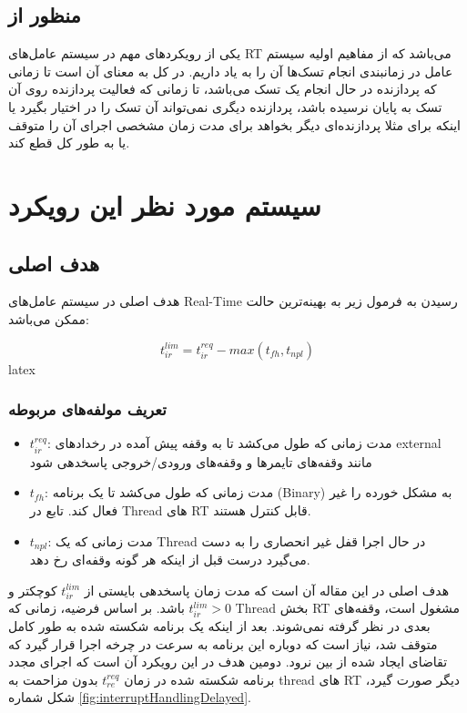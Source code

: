 \documentclass[10pt, a4paper]{article}
\begin{document}
\subsection{منظور از }

یکی از رویکرد‌های مهم در سیستم عامل‌های RT می‌باشد که از مفاهیم اولیه سیستم عامل
در زمانبندی انجام تسک‌ها آن را به یاد داریم. در کل به معنای آن است تا زمانی که
پردازنده در حال انجام یک تسک می‌باشد، تا زمانی که فعالیت پردازنده روی آن تسک به
پایان نرسیده باشد، پردازنده دیگری نمی‌تواند آن تسک را در اختیار بگیرد یا اینکه
برای مثلا پردازنده‌ای دیگر بخواهد برای مدت زمان مشخصی اجرای آن را متوقف یا به
طور کل قطع کند.

\section{سیستم مورد نظر این رویکرد}

\subsection{هدف اصلی}

هدف اصلی در سیستم عامل‌های Real-Time رسیدن به فرمول زیر به بهینه‌ترین حالت ممکن می‌باشد:

\begin{equation}
    t^{lim}_{ir} = t^{req}_{ir} - max(t_{fh}, t_{npl})
\end{equation}latex

\subsubsection{تعریف مولفه‌های مربوطه}

\begin{itemize}
    \item $t^{req}_{ir}$: مدت زمانی که طول می‌کشد تا به وقفه پیش آمده در
    رخداد‌های external مانند وقفه‌های تایمرها و وقفه‌های ورودی/خروجی پاسخدهی شود
    \item $t_{fh}$: مدت زمانی که طول می‌کشد تا  یک برنامه
    (Binary) به مشکل خورده را غیر فعال کند. تابع  در Thread
    های RT قابل کنترل هستند.
    \item $t_{npl}$: مدت زمانی که یک Thread در حال اجرا قفل غیر انحصاری را به
    دست می‌گیرد درست قبل از اینکه هر گونه وقفه‌ای رخ دهد.
\end{itemize}


هدف اصلی در این مقاله آن است که مدت زمان پاسخدهی بایستی از $t^{lim}_{ir}$ کوچکتر
و $t^{lim}_{ir} > 0$ باشد. بر اساس فرضیه، زمانی که Thread بخش RT مشغول است،
وقفه‌های بعدی در نظر گرفته نمی‌شوند. بعد از اینکه یک برنامه شکسته شده به طور
کامل متوقف شد، نیاز است که دوباره این برنامه به سرعت در چرخه اجرا قرار گیرد که
تقاضای ایجاد شده از بین نرود. دومین هدف در این رویکرد آن است که اجرای مجدد
برنامه شکسته شده در زمان $t^{req}_{re}$ بدون مزاحمت به thread های RT دیگر صورت
گیرد، شکل شماره \ref{fig:interruptHandlingDelayed}.
\end{document}
